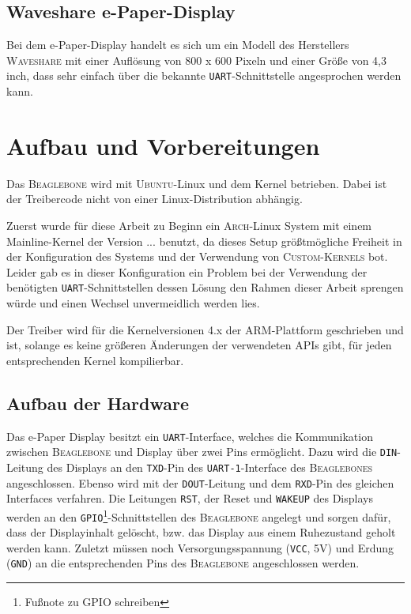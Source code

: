 \section{Waveshare e-Paper-Display}
Bei dem e-Paper-Display handelt es sich um ein Modell des Herstellers \textsc{Waveshare} mit einer Auflösung von 800 x 600 Pixeln und einer Größe von 4,3 inch, dass sehr einfach über die bekannte \texttt{UART}-Schnittstelle angesprochen werden kann. 

\chapter{Aufbau und Vorbereitungen} %
Das \textsc{Beaglebone} wird mit \textsc{Ubuntu}-Linux und dem Kernel %
betrieben. Dabei ist der Treibercode nicht von einer Linux-Distribution abhängig. 

Zuerst wurde für diese Arbeit zu Beginn ein \textsc{Arch}-Linux System mit einem Mainline-Kernel der Version ... benutzt, da dieses Setup größtmögliche Freiheit in der Konfiguration des Systems und der Verwendung von \textsc{Custom-Kernels} bot. Leider gab es in dieser Konfiguration ein Problem bei der Verwendung der benötigten \texttt{UART}-Schnittstellen dessen Lösung den Rahmen dieser Arbeit sprengen würde und einen Wechsel unvermeidlich werden lies.

Der Treiber wird für die Kernelversionen 4.x der \textsc{ARM}-Plattform geschrieben und ist, solange es keine größeren Änderungen der verwendeten APIs gibt, für jeden entsprechenden Kernel kompilierbar.

\section{Aufbau der Hardware}
Das e-Paper Display besitzt ein \texttt{UART}-Interface, welches die Kommunikation zwischen \textsc{Beaglebone} und Display über zwei Pins ermöglicht. Dazu wird die \texttt{DIN}-Leitung des Displays an den \texttt{TXD}-Pin des \texttt{UART-1}-Interface des \textsc{Beaglebones} angeschlossen. Ebenso wird mit der \texttt{DOUT}-Leitung und dem \texttt{RXD}-Pin des gleichen Interfaces verfahren. Die Leitungen \texttt{RST}, der Reset und \texttt{WAKEUP} des Displays werden an den \texttt{GPIO}\footnote{Fußnote zu GPIO schreiben}-Schnittstellen des \textsc{Beaglebone} angelegt und sorgen dafür, dass der Displayinhalt gelöscht, bzw. das Display aus einem Ruhezustand geholt werden kann. Zuletzt müssen noch Versorgungsspannung (\texttt{VCC}, 5V) und Erdung (\texttt{GND}) an die entsprechenden Pins des \textsc{Beaglebone} angeschlossen werden.  

